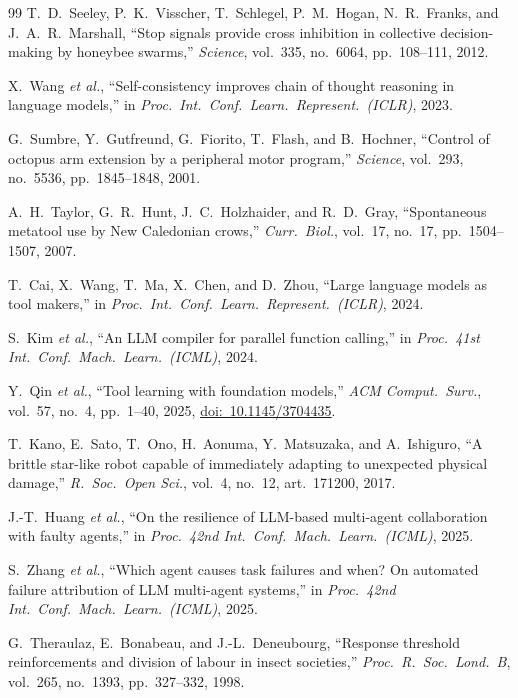 \documentclass[11pt,a4paper]{article}
\begin{document}
\begin{thebibliography}{99}
T.~D.~Seeley, P.~K.~Visscher, T.~Schlegel, P.~M.~Hogan, N.~R.~Franks, and J.~A.~R.~Marshall, ``Stop signals
provide cross inhibition in collective decision-making by honeybee swarms,'' \emph{Science}, vol.~335,
no.~6064, pp.~108--111, 2012.

X.~Wang \emph{et al.}, ``Self-consistency improves chain of thought reasoning in language models,'' in
\emph{Proc.\ Int.\ Conf.\ Learn.\ Represent.\ (ICLR)}, 2023.

G.~Sumbre, Y.~Gutfreund, G.~Fiorito, T.~Flash, and B.~Hochner, ``Control of octopus arm extension by a
peripheral motor program,'' \emph{Science}, vol.~293, no.~5536, pp.~1845--1848, 2001.

A.~H.~Taylor, G.~R.~Hunt, J.~C.~Holzhaider, and R.~D.~Gray, ``Spontaneous metatool use by New Caledonian
crows,'' \emph{Curr.\ Biol.}, vol.~17, no.~17, pp.~1504--1507, 2007.

T.~Cai, X.~Wang, T.~Ma, X.~Chen, and D.~Zhou, ``Large language models as tool makers,'' in \emph{Proc.\
Int.\ Conf.\ Learn.\ Represent.\ (ICLR)}, 2024.

S.~Kim \emph{et al.}, ``An LLM compiler for parallel function calling,'' in \emph{Proc.\ 41st Int.\ Conf.\
Mach.\ Learn.\ (ICML)}, 2024.

Y.~Qin \emph{et al.}, ``Tool learning with foundation models,'' \emph{ACM Comput.\ Surv.}, vol.~57, no.~4,
pp.~1--40, 2025, \href{https://doi.org/10.1145/3704435}{doi:~10.1145/3704435}.

\bibitem{kano2017}
T.~Kano, E.~Sato, T.~Ono, H.~Aonuma, Y.~Matsuzaka, and A.~Ishiguro, ``A brittle star-like robot capable of
immediately adapting to unexpected physical damage,'' \emph{R.\ Soc.\ Open Sci.}, vol.~4, no.~12,
art.~171200, 2017.

J.-T.~Huang \emph{et al.}, ``On the resilience of LLM-based multi-agent collaboration with faulty agents,''
in \emph{Proc.\ 42nd Int.\ Conf.\ Mach.\ Learn.\ (ICML)}, 2025.

\bibitem{zhang2025whowhen}
S.~Zhang \emph{et al.}, ``Which agent causes task failures and when? On automated failure attribution of
LLM multi-agent systems,'' in \emph{Proc.\ 42nd Int.\ Conf.\ Mach.\ Learn.\ (ICML)}, 2025.

\bibitem{theraulaz1998}
G.~Theraulaz, E.~Bonabeau, and J.-L.~Deneubourg, ``Response threshold reinforcements and division of labour
in insect societies,'' \emph{Proc.\ R.\ Soc.\ Lond.\ B}, vol.~265, no.~1393, pp.~327--332, 1998.


\end{thebibliography}
\end{document}
